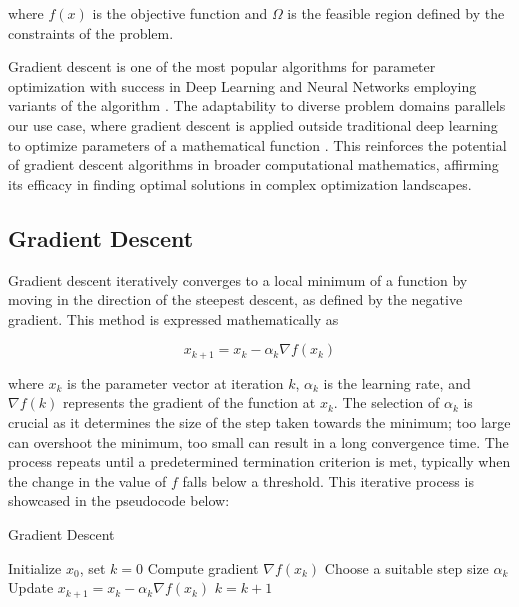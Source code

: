 \documentclass[a4paper]{report}
\begin{document}
where $f(x)$ is the objective function and $\Omega$ is the feasible region defined by the constraints of the problem.

Gradient descent is one of the most popular algorithms for parameter optimization with success in Deep Learning and Neural Networks employing variants of the algorithm \citep{lu2017improved, zhang2019gradient, zeebaree2019trainable}. The adaptability to diverse problem domains \citep{YingjieYugiHaibin2023SGD} parallels our use case, where gradient descent is applied outside traditional deep learning to optimize parameters of a mathematical function \citep{GradientBasedOpt2022}. This reinforces the potential of gradient descent algorithms in broader computational mathematics, affirming its efficacy in finding optimal solutions in complex optimization landscapes.

\subsection{Gradient Descent}
Gradient descent iteratively converges to a local minimum of a function by moving in the direction of the steepest descent, as defined by the negative gradient. This method is expressed mathematically as

\begin{equation}\label{GD}
    x_{k+1} = x_k - \alpha_k \nabla f(x_k)
\end{equation}

where $x_k$ is the parameter vector at iteration $k$, $\alpha_k$ is the learning rate, and $\nabla f(k)$ represents the gradient of the function at $x_k$. The selection of $\alpha_k$ is crucial as it determines the size of the step taken towards the minimum; too large can overshoot the minimum, too small can result in a long convergence time. The process repeats until a predetermined termination criterion is met, typically when the change in the value of $f$ falls below a threshold. This iterative process is showcased in the pseudocode below:

\begin{algorithm}
\caption{Gradient Descent}
\begin{algorithmic}[1]
\State Initialize \( x_0 \), set \( k = 0 \)
    \State Compute gradient \( \nabla f(x_k) \)
    \State Choose a suitable step size \( \alpha_k \)
    \State Update \( x_{k+1} = x_k - \alpha_k \nabla f(x_k) \)
    \State \( k = k + 1 \)
\EndWhile
\end{algorithmic}
\end{algorithm}
\end{document}
